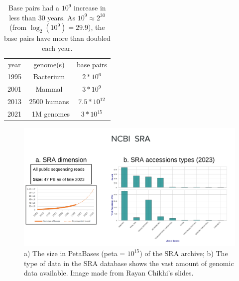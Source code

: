 \begin{table}[!ht]
	\centering
	\begin{tabular}{c | c | c}
		year & genome(s) & base pairs \\
		1995 & Bacterium & $ 2*10^6$ \\
		2001 & Mammal & $ 3*10^9$ \\
		2013 & 2500 humans & $ 7.5*10^12$ \\
		2021 & ~1M genomes & $ 3*10^{15}$ \\
	\end{tabular}
	\caption[DNA data increase over the years.]{Base pairs had a $10^9$ increase in less than 30 years. As $10^9 \approx 2^{30}$ (from $ \log_2(10^9) = 29.9$), the base pairs have more than doubled each year\cite{durbin_recomb}.}
	\label{tab:bp-increase}
\end{table}
\begin{figure}[h!]
	\centering
	\includegraphics[width=\linewidth]{figures/background/sra.png}
	\caption[The Sequence Read Archive.]{a) The size in PetaBases (peta = $10^{15}$) of the SRA archive; b) The type of data in the SRA database shows the vast amount of genomic data available. Image made from Rayan Chikhi's slides.\\}
	\label{fig:SRA}
\end{figure}

